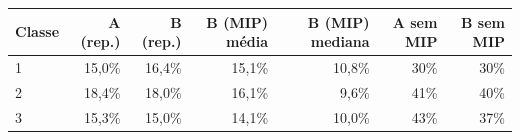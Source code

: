 \begin{tabular}{lrrrrrr}
\toprule
Classe & A (rep.) & B (rep.) & B (MIP) média & B (MIP) mediana & A sem MIP & B sem MIP \\
\midrule
1 & 15,0\% & 16,4\% & 15,1\% & 10,8\% & 30\% & 30\% \\
2 & 18,4\% & 18,0\% & 16,1\% & 9,6\% & 41\% & 40\% \\
3 & 15,3\% & 15,0\% & 14,1\% & 10,0\% & 43\% & 37\% \\
\bottomrule
\end{tabular}

